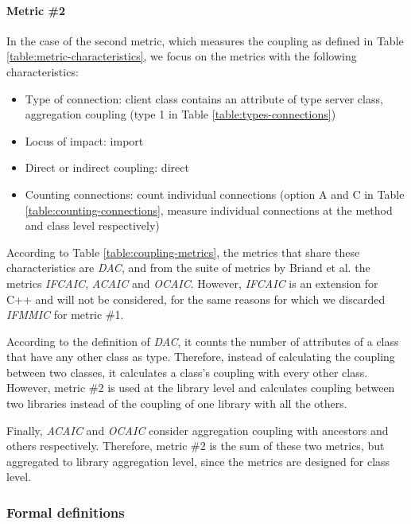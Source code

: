 \paragraph{Metric \#2}
In the case of the second metric, which measures the coupling as defined in Table \ref{table:metric-characteristics}, we focus on the metrics with the following characteristics:

\begin{itemize}
  \item Type of connection: client class contains an attribute of type server class, aggregation coupling (type 1 in Table \ref{table:types-connections})
  \item Locus of impact: import
  \item Direct or indirect coupling: direct
  \item Counting connections: count individual connections (option A and C in Table \ref{table:counting-connections}, measure individual connections at the method and class level respectively)
\end{itemize}

According to Table \ref{table:coupling-metrics}, the metrics that share these characteristics are \textit{DAC}, and from the suite of metrics by Briand et al. \cite{briand1997investigation} the metrics \textit{IFCAIC}, \textit{ACAIC} and \textit{OCAIC}. However, \textit{IFCAIC} is an extension for C++ and will not be considered, for the same reasons for which we discarded \textit{IFMMIC} for metric \#1.

According to the definition of \textit{DAC}, it counts the number of attributes of a class that have any other class as type. Therefore, instead of calculating the coupling between two classes, it calculates a class's coupling with every other class. However, metric \#2 is used at the library level and calculates coupling between two libraries instead of the coupling of one library with all the others.

Finally, \textit{ACAIC} and \textit{OCAIC} consider aggregation coupling with ancestors and others respectively. Therefore, metric  \#2 is the sum of these two metrics, but aggregated to library aggregation level, since the metrics are designed for class level.

\subsubsection{Formal definitions}\label{subsec:metric-definition}

